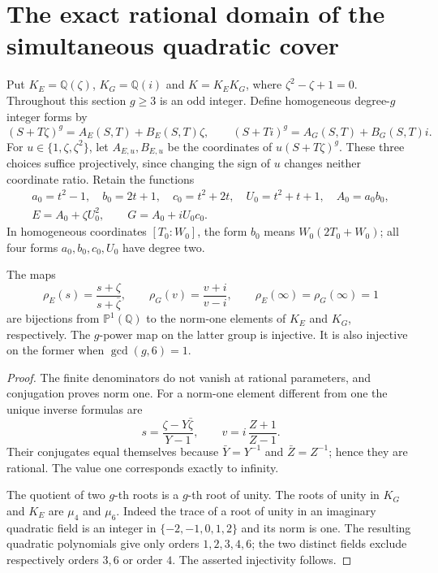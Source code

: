 \section{The exact rational domain of the simultaneous quadratic cover}
\label{rl-section}

Put $K_E=\mathbb Q(\zeta)$, $K_G=\mathbb Q(i)$ and $K=K_EK_G$,
where $\zeta^2-\zeta+1=0$. Throughout this section $g\geq3$ is an odd
integer. Define homogeneous degree-$g$ integer forms by
\[
 (S+T\zeta)^g=A_E(S,T)+B_E(S,T)\zeta,\qquad
 (S+Ti)^g=A_G(S,T)+B_G(S,T)i.
\]
For $u\in\{1,\zeta,\zeta^2\}$, let $A_{E,u},B_{E,u}$ be the
coordinates of $u(S+T\zeta)^g$. These three choices suffice
projectively, since changing the sign of $u$ changes neither
coordinate ratio. Retain the functions
\begin{gather}
 a_0=t^2-1,\quad b_0=2t+1,\quad c_0=t^2+2t,\quad
 U_0=t^2+t+1,\quad A_0=a_0b_0,\label{rl-parameters}\\
 E=A_0+\zeta U_0^2,\qquad G=A_0+iU_0c_0.\label{rl-elements}
\end{gather}
In homogeneous coordinates $[T_0:W_0]$, the form $b_0$ means
$W_0(2T_0+W_0)$; all four forms $a_0,b_0,c_0,U_0$ have degree two.

\begin{lemma}\label{rl-norm-one}
The maps
\[
 \rho_E(s)=\frac{s+\zeta}{s+\bar\zeta},\qquad
 \rho_G(v)=\frac{v+i}{v-i},
 \qquad \rho_E(\infty)=\rho_G(\infty)=1
\]
are bijections from $\mathbb P^1(\mathbb Q)$ to the norm-one
elements of $K_E$ and $K_G$, respectively. The $g$-power map on
the latter group is injective. It is also injective on the former
when $\gcd(g,6)=1$.
\end{lemma}
\begin{proof}
The finite denominators do not vanish at rational parameters, and
conjugation proves norm one. For a norm-one element different from
one the unique inverse formulas are
\[
 s=\frac{\zeta-Y\bar\zeta}{Y-1},\qquad
 v=i\,\frac{Z+1}{Z-1}.
\]
Their conjugates equal themselves because $\bar Y=Y^{-1}$ and
$\bar Z=Z^{-1}$; hence they are rational. The value one corresponds
exactly to infinity.

The quotient of two $g$-th roots is a $g$-th root of unity.
The roots of unity in $K_G$ and $K_E$ are $\mu_4$ and $\mu_6$.
Indeed the trace of a root of unity in an imaginary quadratic field
is an integer in $\{-2,-1,0,1,2\}$ and its norm is one. The
resulting quadratic polynomials give only orders $1,2,3,4,6$;
the two distinct fields exclude respectively orders $3,6$ or order
$4$. The asserted injectivity follows.
\end{proof}

